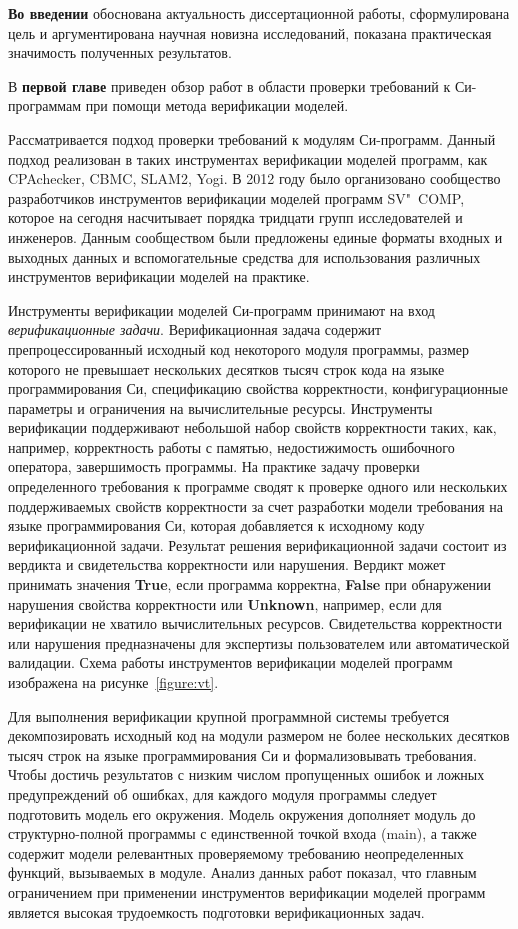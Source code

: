 \documentclass[%
autoref,
colorlinks,  
facsimile,   %
]{disser}
\begin{document}



\textbf{Во введении} обоснована актуальность диссертационной работы, сформулирована цель и аргументирована научная новизна исследований, показана практическая значимость полученных результатов.

В \textbf{первой главе} приведен обзор работ в области проверки требований к Си-программам при помощи метода верификации моделей.

Рассматривается подход проверки требований к модулям Си-программ.
Данный подход реализован в таких инструментах верификации моделей программ, как CPAchecker, CBMC, SLAM2, Yogi.
В 2012 году было организовано сообщество разработчиков инструментов верификации моделей программ SV"~COMP, которое на сегодня насчитывает порядка тридцати групп исследователей и инженеров. 
Данным сообществом были предложены единые форматы входных и выходных данных и вспомогательные средства для использования различных инструментов верификации моделей на практике.

Инструменты верификации моделей Си-программ принимают на вход \textit{верификационные задачи}.
Верификационная задача содержит препроцессированный исходный код некоторого модуля программы, размер которого не превышает нескольких десятков тысяч строк кода на языке программирования Си, спецификацию свойства корректности, конфигурационные параметры и ограничения на вычислительные ресурсы.
Инструменты верификации поддерживают небольшой набор свойств корректности таких, как, например, корректность работы с памятью, недостижимость ошибочного оператора, завершимость программы.
На практике задачу проверки определенного требования к программе сводят к проверке одного или нескольких поддерживаемых свойств корректности за счет разработки модели требования на языке программирования Си, которая добавляется к исходному коду верификационной задачи.
Результат решения верификационной задачи состоит из вердикта и свидетельства корректности или нарушения.
Вердикт может принимать значения \textbf{True}, если программа корректна, \textbf{False} при обнаружении нарушения свойства корректности или \textbf{Unknown}, например, если для верификации не хватило вычислительных ресурсов.
Свидетельства корректности или нарушения предназначены для экспертизы пользователем или автоматической валидации.
Схема работы инструментов верификации моделей программ изображена на рисунке~\ref{figure:vt}.

Для выполнения верификации крупной программной системы требуется декомпозировать исходный код на модули размером не более нескольких десятков тысяч строк на языке программирования Си и формализовывать требования.
Чтобы достичь результатов с низким числом пропущенных ошибок и ложных предупреждений об ошибках, для каждого модуля программы следует подготовить модель его окружения.
Модель окружения дополняет модуль до структурно-полной программы с единственной точкой входа (main), а также содержит модели релевантных проверяемому требованию неопределенных функций, вызываемых в модуле. 
Анализ данных работ показал, что главным ограничением при применении инструментов верификации моделей программ является высокая трудоемкость подготовки верификационных задач.
\end{document}

